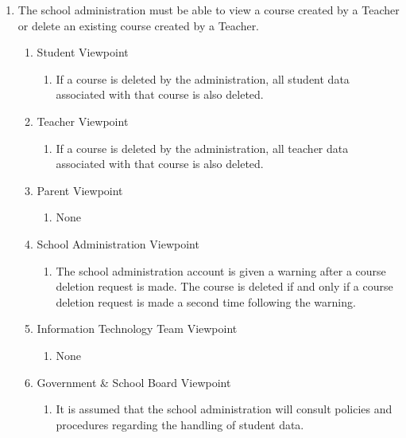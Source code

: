 \documentclass[]{article}
\begin{document}
\begin{enumerate}[{BE}1.]
	\item The school administration must be able to view a course created by a 
Teacher or delete an existing course created by a Teacher.
	\begin{enumerate}[{VP1}.1]
		\item Student Viewpoint
			\begin{enumerate}
				\item If a course is deleted by the administration, all student data 
associated with that course is also deleted.
			\end{enumerate}
		\item Teacher Viewpoint
			\begin{enumerate}
				\item If a course is deleted by the administration, all teacher data 
associated with that course is also deleted.
			\end{enumerate}
		\item Parent Viewpoint
			\begin{enumerate}
				\item None
			\end{enumerate}
		\item School Administration Viewpoint
			\begin{enumerate}
				\item The school administration account is given a warning after a course 
deletion request is made. The course is deleted if and only if a course deletion 
request is made a second time following the warning.
			\end{enumerate}
		\item Information Technology Team Viewpoint
			\begin{enumerate}
				\item None
			\end{enumerate}
		\item Government \& School Board Viewpoint
			\begin{enumerate}
				\item It is assumed that the school administration will consult policies and 
procedures regarding the handling of student data.
			\end{enumerate}
	\end{enumerate}


\end{enumerate}
\end{document}
